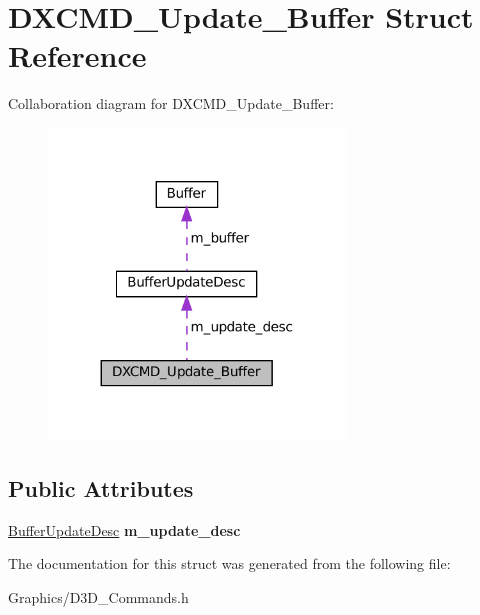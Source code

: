 \hypertarget{structDXCMD__Update__Buffer}{}\section{D\+X\+C\+M\+D\+\_\+\+Update\+\_\+\+Buffer Struct Reference}
\label{structDXCMD__Update__Buffer}


Collaboration diagram for D\+X\+C\+M\+D\+\_\+\+Update\+\_\+\+Buffer\+:\nopagebreak
\begin{figure}[H]
\begin{center}
\leavevmode
\includegraphics[width=224pt]{structDXCMD__Update__Buffer__coll__graph}
\end{center}
\end{figure}
\subsection*{Public Attributes}
\begin{DoxyCompactItemize}
\item 
\mbox{\label{structDXCMD__Update__Buffer_a9ba3a77094da62ec742309d5588caaaf}} 
\hyperlink{structBufferUpdateDesc}{Buffer\+Update\+Desc} {\bfseries m\+\_\+update\+\_\+desc}
\end{DoxyCompactItemize}


The documentation for this struct was generated from the following file\+:\begin{DoxyCompactItemize}
\item 
Graphics/D3\+D\+\_\+\+Commands.\+h\end{DoxyCompactItemize}
